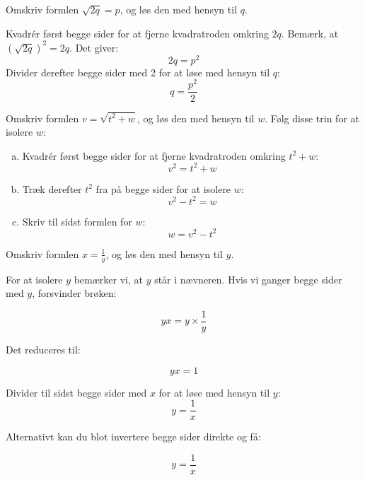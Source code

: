 \begin{example} Omskriv formlen \(\sqrt{2q} = p\), og løs den med hensyn til \(q\).

\begin{solution}
   Kvadrér først begge sider for at fjerne kvadratroden omkring \(2q\). Bemærk, at \((\sqrt{2q})^2 = 2q\). Det giver:
\[
2q = p^2
\]
Divider derefter begge sider med 2 for at løse med hensyn til \(q\):
\[
q = \frac{p^2}{2}
\]   
\end{solution}
 
\end{example}

\newpage

\begin{example}
Omskriv formlen \(v = \sqrt{t^2 + w}\), og løs den med hensyn til \(w\). Følg disse trin for at isolere \(w\):   

\begin{solution}
    \begin{enumerate}[a.]
        \item Kvadrér først begge sider for at fjerne kvadratroden omkring \(t^2 + w\):
        \[
        v^2 = t^2 + w
        \]

        \item Træk derefter \(t^2\) fra på begge sider for at isolere \(w\):
        \[
        v^2 - t^2 = w
        \]

        \item Skriv til sidst formlen for \(w\):
        \[
        w = v^2 - t^2
        \]
    \end{enumerate}

    \end{solution}
\end{example}

\begin{example} Omskriv formlen \(x = \frac{1}{y}\), og løs den med hensyn til \(y\).

\begin{solution}
For at isolere \(y\) bemærker vi, at \(y\) står i nævneren. Hvis vi ganger begge sider med \(y\), forsvinder brøken:

\[
yx = y \times \frac{1}{y}
\]

Det reduceres til:

\[
yx = 1
\]

Divider til sidst begge sider med \(x\) for at løse med hensyn til \(y\):
\[
y = \frac{1}{x}
\]

Alternativt kan du blot invertere begge sider direkte og få:

\[
y = \frac{1}{x}
\]    
\end{solution}


\end{example}


